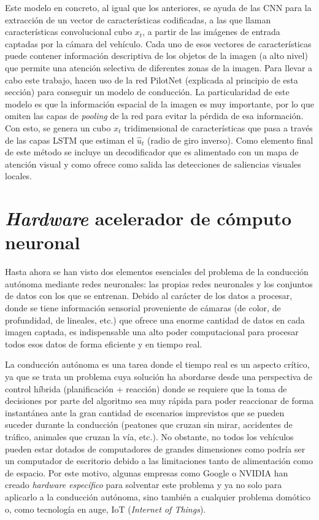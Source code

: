 Este modelo en concreto, al igual que los anteriores, se ayuda de las CNN para la extracción de un vector de características codificadas, a las que llaman características convolucional cubo $x_t$, a partir de las imágenes de entrada captadas por la cámara del vehículo. Cada uno de esos vectores de características puede contener información descriptiva de los objetos de la imagen (a alto nivel) que permite una atención selectiva de diferentes zonas de la imagen. Para llevar a cabo este trabajo, hacen uso de la red PilotNet (explicada al principio de esta sección) para conseguir un modelo de conducción. La particularidad de este modelo es que la información espacial de la imagen es muy importante, por lo que omiten las capas de \textit{pooling} de la red para evitar la pérdida de esa información. Con esto, se genera un cubo $x_t$ tridimensional de características que pasa a través de las capas LSTM que estiman el $\hat{u}_t$ (radio de giro inverso). Como elemento final de este método se incluye un decodificador que es alimentado con un mapa de atención visual y como ofrece como salida las detecciones de saliencias visuales locales.


\section{\textit{Hardware} acelerador de cómputo neuronal}

Hasta ahora se han visto dos elementos esenciales del problema de la conducción autónoma mediante redes neuronales: las propias redes neuronales y los conjuntos de datos con los que se entrenan. Debido al carácter de los datos a procesar, donde se tiene información sensorial proveniente de cámaras (de color, de profundidad, de lineales, etc.) que ofrece una enorme cantidad de datos en cada imagen captada, es indispensable una alto poder computacional para procesar todos esos datos de forma eficiente y en tiempo real.

La conducción autónoma es una tarea donde el tiempo real es un aspecto crítico, ya que se trata un problema cuya solución ha abordarse desde una perspectiva de control híbrida (planificación + reacción) donde se requiere que la toma de decisiones por parte del algoritmo sea muy rápida para poder reaccionar de forma instantánea ante la gran cantidad de escenarios imprevistos que se pueden suceder durante la conducción (peatones que cruzan sin mirar, accidentes de tráfico, animales que cruzan la vía, etc.). No obstante, no todos los vehículos pueden estar dotados de computadores de grandes dimensiones como podría ser un computador de escritorio debido a las limitaciones tanto de alimentación como de espacio. Por este motivo, algunas empresas como Google o NVIDIA han creado \textit{hardware específico} para solventar este problema y ya no solo para aplicarlo a la conducción autónoma, sino también a cualquier problema domótico o, como tecnología en auge, IoT (\textit{Internet of Things}). 

